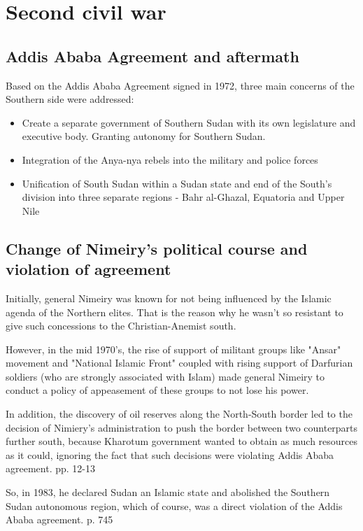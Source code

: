 \documentclass[14pt,a4paper]{article}
\begin{document}
\section{Second civil war}

\subsection{Addis Ababa Agreement and aftermath}

Based on the Addis Ababa Agreement signed in 1972, three main concerns of the Southern side were addressed:
\begin{itemize}
        \item Create a separate government of Southern Sudan with its own legislature and executive body. Granting autonomy for Southern Sudan. 
        \item Integration of the Anya-nya rebels into the military and police forces
        \item Unification of South Sudan within a Sudan state and end of the South's division into three separate regions - Bahr al-Ghazal, Equatoria and Upper Nile
\end{itemize}

\subsection{Change of Nimeiry's political course and violation of agreement}

Initially, general Nimeiry was known for not being influenced by the Islamic agenda of the Northern elites. That is the reason why he wasn't so resistant to give such concessions to the Christian-Anemist south.

However, in the mid 1970's, the rise of support of militant groups like "Ansar" movement and "National Islamic Front" coupled with rising support of Darfurian soldiers (who are strongly associated with Islam) made general Nimeiry to conduct a policy of appeasement of these groups to not lose his power. 

In addition, the discovery of oil reserves along the North-South border led to the decision of Nimiery's administration to push the border between two counterparts further south, because Kharotum government wanted to obtain as much resources as it could, ignoring the fact that such decisions were violating Addis Ababa agreement. \cite{raftopoulos2006peace} pp. 12-13

So, in 1983, he declared Sudan an Islamic state and abolished the Southern Sudan autonomous region, which of course, was a direct violation of the Addis Ababa agreement. \cite{derouen2007civil} p. 745
\end{document}
